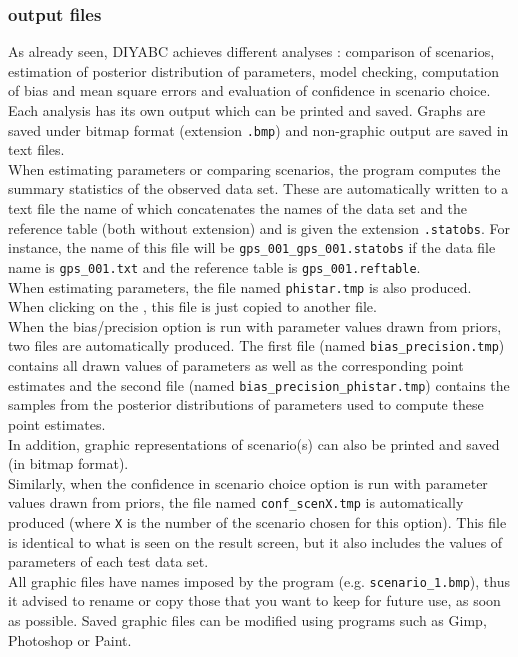 \subsubsection{output files}
As already seen, DIYABC achieves different analyses : comparison of scenarios, estimation of posterior distribution of parameters, model checking,  computation of bias and mean square errors and evaluation of confidence in scenario choice. Each analysis has its own output which can be printed and saved. Graphs are saved under bitmap format (extension \texttt{.bmp}) and non-graphic output are saved in text files.\\
When estimating parameters or comparing scenarios, the program computes the summary statistics of the observed data set. These are automatically written to a text file the name of which concatenates the names of the data set and the reference table (both without extension) and is given the extension \texttt{.statobs}. For instance, the name of this file will be \texttt{gps\_001\_gps\_001.statobs} if the data file name is \texttt{gps\_001.txt} and the reference table is \texttt{gps\_001.reftable}.\\
 When estimating parameters, the file named \texttt{phistar.tmp} is also produced. When clicking on the , this file is just copied to another file.\\
 When the bias/precision option is run with parameter values drawn from priors, two files  are automatically produced. The first file (named \texttt{bias\_precision.tmp}) contains all drawn values of parameters as well as the corresponding point estimates and the second file (named \texttt{bias\_precision\_phistar.tmp}) contains the samples from the posterior distributions of parameters used to compute these point estimates.\\
In addition, graphic representations of scenario(s) can also be printed and saved (in bitmap format).\\
Similarly, when the confidence in scenario choice option is run with parameter values drawn from priors, the file named \texttt{conf\_scenX.tmp} is automatically produced (where \texttt{X} is the number of the scenario chosen for this option). This file is identical to what is seen on the result screen, but it also includes the values of parameters of each test data set.\\
All graphic files have names imposed by the program (e.g.  \texttt{scenario\_1.bmp}),  thus it advised to rename or copy those that you want to keep for future use, as soon as possible. Saved graphic files can be modified using programs such as Gimp, Photoshop or Paint. 


